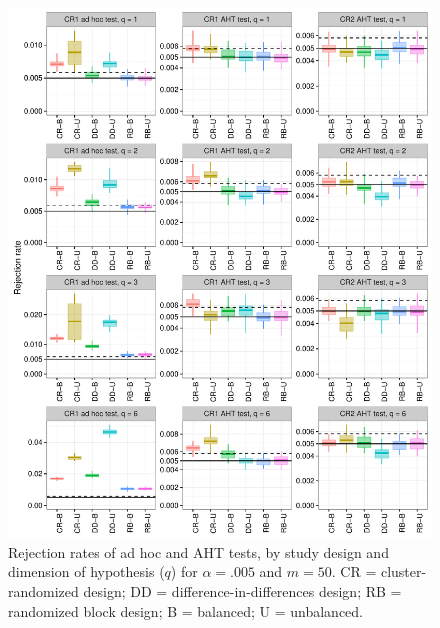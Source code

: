 \documentclass{article}\usepackage[]{graphicx}\usepackage[]{color}
\newenvironment{knitrout}{}{} %
\begin{document}
\begin{knitrout}
\color{fgcolor}\begin{figure}[H]

{\centering \includegraphics[width=\linewidth]{CR_fig/balance_005_50-1} 

}

\caption[Rejection rates of ad hoc and AHT tests, by study design and dimension of hypothesis (]{Rejection rates of ad hoc and AHT tests, by study design and dimension of hypothesis ($q$) for $\alpha = .005$ and $m = 50$. CR = cluster-randomized design; DD = difference-in-differences design; RB = randomized block design; B = balanced; U = unbalanced.}\label{fig:balance_005_50}
\end{figure}


\end{knitrout}
\end{document}
